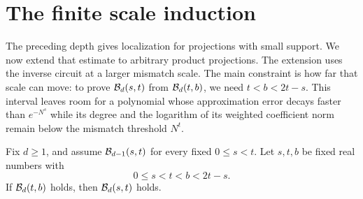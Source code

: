 \section{The finite scale induction}
\label{sec:bootstrap}

The preceding depth gives localization for projections with small
support. We now extend that estimate to arbitrary product projections.
The extension uses the inverse circuit at a larger mismatch scale.
The main constraint is how far that scale can move: to prove
$\mathcal B_d(s,t)$ from $\mathcal B_d(t,b)$, we need
$t<b<2t-s$. This interval leaves room for a polynomial whose
approximation error decays faster than $e^{-N^s}$ while its degree
and the logarithm of its weighted coefficient norm remain below the
mismatch threshold $N^t$.

\begin{lemma}
\label{lem:backward}
Fix \(d\ge1\), and assume \(\mathcal B_{d-1}(s,t)\) for every fixed
\(0\le s<t\). Let \(s,t,b\) be fixed real numbers with
\[
 0\le s<t<b<2t-s.
\]
If \(\mathcal B_d(t,b)\) holds, then \(\mathcal B_d(s,t)\) holds.
\end{lemma}

